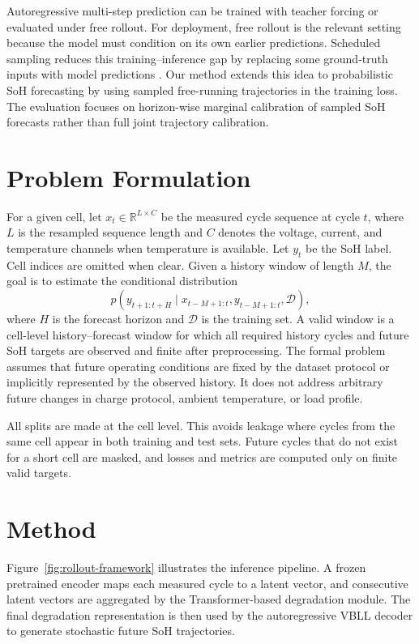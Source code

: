 \documentclass[conference]{IEEEtran}
\begin{document}
Autoregressive multi-step prediction can be trained with teacher forcing or
evaluated under free rollout. For deployment, free rollout is the relevant
setting because the model must condition on its own earlier predictions.
Scheduled sampling reduces this training--inference gap by replacing some
ground-truth inputs with model predictions \cite{bengio2015scheduled}. Our
method extends this idea to probabilistic SoH forecasting by using sampled
free-running trajectories in the training loss. The evaluation focuses on
horizon-wise marginal calibration of sampled SoH forecasts rather than full
joint trajectory calibration.

\section{Problem Formulation}

For a given cell, let $x_t \in \mathbb{R}^{L \times C}$ be the measured cycle
sequence at cycle $t$, where $L$ is the resampled sequence length and $C$
denotes the voltage, current, and temperature channels when temperature is
available. Let $y_t$ be the SoH label. Cell indices are omitted when clear.
Given a history window of length $M$, the goal is to estimate the conditional
distribution
\begin{equation}
p\left(y_{t+1:t+H} \mid x_{t-M+1:t}, y_{t-M+1:t}, \mathcal{D}\right),
\end{equation}
where $H$ is the forecast horizon and $\mathcal{D}$ is the training set. A valid window is a
cell-level history--forecast window for which all required history cycles and
future SoH targets are observed and finite after preprocessing. The formal problem
assumes that future operating conditions are fixed by the dataset protocol or
implicitly represented by the observed history. It does not address arbitrary
future changes in charge protocol, ambient temperature, or load profile.

All splits are made at the cell level. This avoids leakage where cycles from
the same cell appear in both training and test sets. Future cycles that do not
exist for a short cell are masked, and losses and metrics are computed only on
finite valid targets.

\section{Method}

Figure~\ref{fig:rollout-framework} illustrates the inference pipeline. A
frozen pretrained encoder maps each measured cycle to a latent vector, and
consecutive latent vectors are aggregated by the Transformer-based degradation
module. The final degradation representation is then used by the
autoregressive VBLL decoder to generate stochastic future SoH trajectories.
\end{document}
